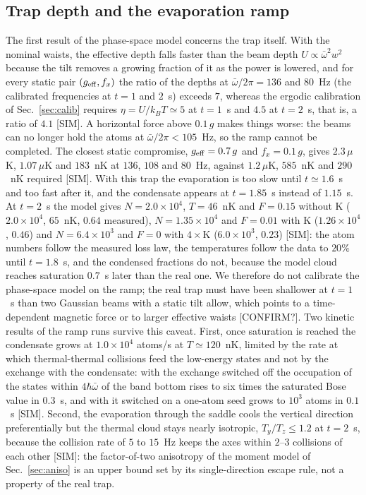 \subsection{Trap depth and the evaporation ramp}
The first result of the phase-space model concerns the trap itself. With the
nominal waists, the effective depth falls faster than the beam depth
$U\propto\bar\omega^2w^2$ because the tilt removes a growing fraction of it
as the power is lowered, and for every static pair $(g_{\rm eff},f_x)$ the
ratio of the depths at $\bar\omega/2\pi=136$ and $80$~Hz (the calibrated
frequencies at $t=1$ and $2$~s) exceeds $7$, whereas the ergodic calibration
of Sec.~\ref{sec:calib} requires $\eta=U/k_BT\simeq5$ at $t=1$~s and
$4.5$ at $t=2$~s, that is, a ratio of $4.1$ [SIM]. A horizontal force above
$0.1\,g$ makes things worse: the beams can no longer hold the atoms at
$\bar\omega/2\pi<105$~Hz, so the ramp cannot be completed. The closest
static compromise, $g_{\rm eff}=0.7\,g$ and $f_x=0.1\,g$, gives
$2.3\,\mu$K, $1.07\,\mu$K and $183$~nK at $136$, $108$ and $80$~Hz, against
$1.2\,\mu$K, $585$~nK and $290$~nK required [SIM]. With this trap the
evaporation is too slow until $t\simeq1.6$~s and too fast after it, and the
condensate appears at $t=1.85$~s instead of $1.15$~s. At $t=2$~s the model
gives $N=2.0\times10^4$, $T=46$~nK and $F=0.15$ without K
($2.0\times10^4$, $65$~nK, $0.64$ measured), $N=1.35\times10^4$ and $F=0.01$
with K ($1.26\times10^4$, $0.46$) and $N=6.4\times10^3$ and $F=0$ with
$4\times$K ($6.0\times10^3$, $0.23$) [SIM]: the atom numbers follow the
measured loss law, the temperatures follow the data to $20\%$ until
$t=1.8$~s, and the condensed fractions do not, because the model cloud
reaches saturation $0.7$~s later than the real one. We therefore do not
calibrate the phase-space model on the ramp; the real trap must have
been shallower at $t=1$~s than two Gaussian beams with a static tilt allow,
which points to a time-dependent magnetic force or to larger effective
waists [CONFIRM?]. Two kinetic results of the ramp runs survive this
caveat. First, once saturation is reached the condensate grows at
$1.0\times10^4$ atoms/s at $T\simeq120$~nK, limited by the rate at which
thermal-thermal collisions feed the low-energy states and not by the
exchange with the condensate: with the exchange switched off the occupation
of the states within $4\hbar\bar\omega$ of the band bottom rises to six
times the saturated Bose value in $0.3$~s, and with it switched on a
one-atom seed grows to $10^3$ atoms in $0.1$~s [SIM]. Second, the
evaporation through the saddle cools the vertical direction preferentially
but the thermal cloud stays nearly isotropic, $T_y/T_z\le1.2$ at $t=2$~s,
because the collision rate of $5$ to $15$~Hz keeps the axes within
$2$--$3$ collisions of each other [SIM]: the factor-of-two anisotropy of
the moment model of Sec.~\ref{sec:aniso} is an upper bound set by its
single-direction escape rule, not a property of the real trap.

